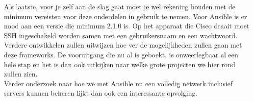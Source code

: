 Als laatste, voor je zelf aan de slag gaat moet je wel rekening houden met de minimum vereisten voor deze onderdelen in gebruik te nemen. Voor Ansible is er nood aan een versie die minimum 2.1.0 is. Op het apparaat die Cisco draait moet SSH ingeschakeld worden samen met een gebruikersnaam en een wachtwoord. 
\\

Verdere ontwikkelen zullen uitwijzen hoe ver de mogelijkheden zullen gaan met deze frameworks. De vooruitgang die nu al is geboekt, is onweerlegbaar al een hele stap en het is dan ook uitkijken naar welke grote projecten we hier rond zullen zien.
\\

Verder onderzoek naar hoe we met Ansible nu een volledig netwerk inclusief servers kunnen beheren lijkt dan ook een interessante opvolging.
